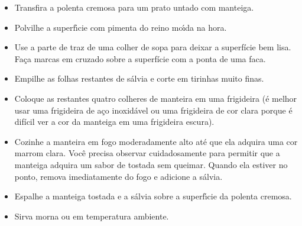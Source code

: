 \documentclass[11pt,letterpaper]{article}
\begin{document}
\begin{description}
\begin{enumerate}
\begin{itemize}
        		\item Transfira a polenta cremosa para um prato untado com manteiga. 
		\item Polvilhe a superf\'{\i}cie com pimenta do reino mo\'{\i}da na hora. 
		\item Use a parte de traz de uma colher de sopa para deixar a superf\'icie bem lisa. Fa\c{c}a marcas em cruzado sobre a superf\'icie com a ponta de uma faca.
		\item Empilhe as folhas restantes de s\'alvia e corte em tirinhas muito finas. 
		\item Coloque as restantes quatro colheres de manteira em uma frigideira (\'e melhor usar uma frigideira de a\c{c}o inoxid\'avel ou uma frigideira de cor clara porque \'e dif\'icil ver a cor da manteiga em uma frigideira escura).
		\item Cozinhe a manteira em fogo moderadamente alto at\'e que ela adquira uma cor marrom clara. Voc\^e precisa observar cuidadosamente para permitir que a manteiga adquira um sabor de tostada sem queimar. Quando ela estiver no ponto, remova imediatamente do fogo e adicione a s\'alvia. 
		\item Espalhe a manteiga tostada e a s\'alvia sobre a superf\'{\i}cie da polenta cremosa.  
		\item Sirva morna ou em temperatura ambiente.
	\end{itemize}
     	\end{enumerate}         
\end{description}
\end{document}
